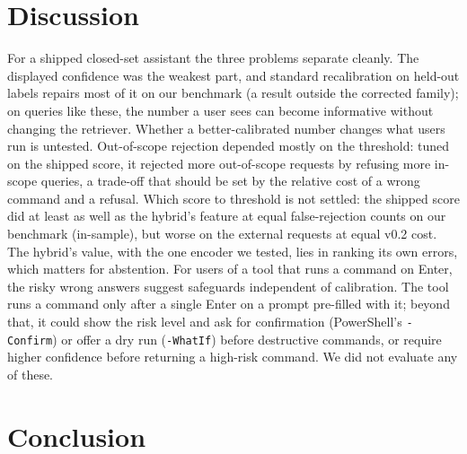 \section{Discussion}

For a shipped closed-set assistant the three problems separate cleanly. The displayed confidence was the weakest
part, and standard recalibration on held-out labels repairs most of it on our benchmark (a result outside the
corrected family); on queries like these, the number a user sees can become informative without changing the
retriever. Whether a better-calibrated number changes what users run is untested. Out-of-scope rejection depended
mostly on the threshold: tuned on the shipped score, it rejected more out-of-scope requests by refusing more in-scope
queries, a trade-off that should be set by the relative cost of a wrong command and a refusal. Which score to
threshold is not settled: the shipped score did at least as well as the hybrid's feature at equal false-rejection
counts on our benchmark (in-sample), but worse on the external requests at equal v0.2 cost. The
hybrid's value, with the one encoder we tested, lies in ranking its own errors, which matters for abstention. For
users of a tool that runs a command on Enter, the risky wrong answers suggest safeguards independent of calibration.
The tool runs a command only after a single Enter on a prompt pre-filled with it; beyond that, it could show the risk level and
ask for confirmation (PowerShell's \texttt{-Confirm}) or offer a dry run (\texttt{-WhatIf}) before destructive
commands, or require higher confidence before returning a high-risk command. We did not evaluate any of these.

\section{Conclusion}

